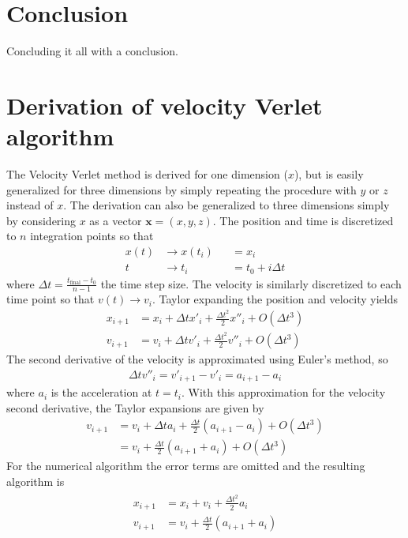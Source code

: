 \documentclass[aps,reprint]{revtex4-1}
\newcommand\blankpage{%
  \null
  \thispagestyle{empty}%
  \addtocounter{page}{-1}%
  \newpage}
\begin{document}
\section{Conclusion}
\label{sec:conclusion}
Concluding it all with a conclusion.

\blankpage
\appendix
\section{Derivation of velocity Verlet algorithm}
\label{sec:velocityverlet}
The Velocity Verlet method is derived for one dimension ($x$), but is easily
generalized for three dimensions by simply repeating the procedure with $y$
or $z$ instead of $x$. The derivation can also be generalized to three dimensions
simply by considering $x$ as a vector $\mathbf{x} = (x, y, z)$.
The position and time is discretized to $n$ integration points so that
\begin{align*}
  x(t) &\rightarrow x(t_i) &&= x_i \\
  t &\rightarrow t_i &&= t_0 + i\Delta{t}
\end{align*}
where $\Delta{t} = \frac{t_\text{final} - t_0}{n-1}$ the time step size. The velocity
is similarly discretized to each time point so that $v(t) \rightarrow v_i$.
Taylor expanding the position and velocity yields
\begin{align*}
  x_{i+1} &= x_i + \Delta{t} x'_i + \frac{\Delta{t}^2}{2} x''_i + O(\Delta{t}^3) \\
  v_{i+1} &= v_i + \Delta{t} v'_i + \frac{\Delta{t}^2}{2} v''_i + O(\Delta{t}^3)
\end{align*}
The second derivative of the velocity is approximated using Euler's method, so
\begin{align*}
  \Delta{t} v''_i = v'_{i+1} - v'_{i} = a_{i+1} - a_{i}
\end{align*}
where $a_i$ is the acceleration at $t = t_i$. With this approximation for the
velocity second derivative, the Taylor expansions are given by
\begin{align*}
  v_{i+1} &= v_i + \Delta{t} a_i + \frac{\Delta{t}}{2} (a_{i+1} - a_i) + O(\Delta{t}^3) \\
          &= v_i + \frac{\Delta{t}}{2} (a_{i+1} + a_{i}) + O(\Delta{t}^3)
\end{align*}
For the numerical algorithm the error terms are omitted and the resulting
algorithm is
\begin{align}
  \begin{split}
    x_{i+1} &= x_i + v_i + \frac{\Delta{t}^2}{2} a_i \\
    v_{i+1} &= v_i + \frac{\Delta{t}}{2}(a_{i+1} + a_{i})
  \end{split}
\end{align}
\blankpage
\end{document}
